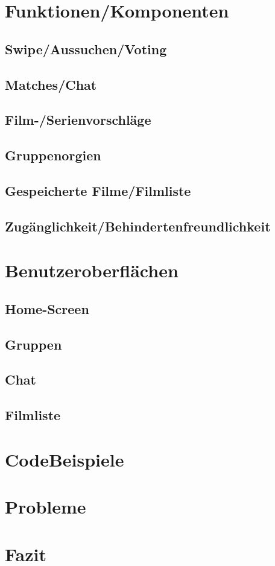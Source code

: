 \documentclass[11pt,a4paper]{article}
\begin{document}
\section{Funktionen/Komponenten}

\subsection{Swipe/Aussuchen/Voting}		
\subsection{Matches/Chat}		
\subsection{Film-/Serienvorschläge}		
\subsection{Gruppenorgien}		
\subsection{Gespeicherte Filme/Filmliste}		
\subsection{Zugänglichkeit/Behindertenfreundlichkeit}		


\section{Benutzeroberflächen}
\subsection{Home-Screen}
\subsection{Gruppen}		
\subsection{Chat}		
\subsection{Filmliste}

\section{CodeBeispiele}


\section{Probleme}


\section{Fazit}
\end{document}
